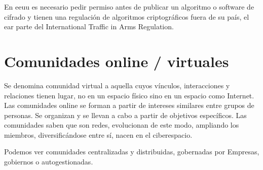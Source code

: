 En \gls{eeuu} es necesario pedir permiso antes de publicar un algoritmo o software de cifrado y tienen una regulación de algoritmos criptográficos fuera de su país, el \gls{ear} parte del International Traffic in Arms Regulation.

\section{Comunidades online / virtuales}

Se denomina comunidad virtual a aquella cuyos vínculos, interacciones y relaciones tienen lugar, no en un espacio físico sino en un espacio como Internet.
Las comunidades online se forman a partir de intereses similares entre grupos de personas. Se organizan y se llevan a cabo a partir de objetivos específicos.
Las comunidades saben que son redes, evolucionan de este modo, ampliando los miembros, diversificándose entre sí, nacen en el ciberespacio.

Podemos ver comunidades centralizadas y distribuidas, gobernadas por Empresas, gobiernos o autogestionadas.
